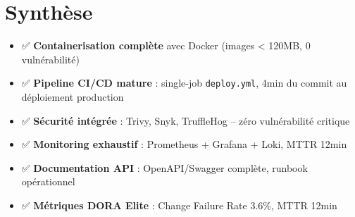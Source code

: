\section{Synthèse}

\begin{tcolorbox}[colback=blue!5!white,colframe=blue!60!black,title=\textbf{Points clés de l'infrastructure DevOps}]
\begin{itemize}
    \item ✅ \textbf{Containerisation complète} avec Docker (images < 120MB, 0 vulnérabilité)
    \item ✅ \textbf{Pipeline CI/CD mature} : single-job \texttt{deploy.yml}, 4min du commit au déploiement production
    \item ✅ \textbf{Sécurité intégrée} : Trivy, Snyk, TruffleHog -- zéro vulnérabilité critique
    \item ✅ \textbf{Monitoring exhaustif} : Prometheus + Grafana + Loki, MTTR 12min
    \item ✅ \textbf{Documentation API} : OpenAPI/Swagger complète, runbook opérationnel
    \item ✅ \textbf{Métriques DORA Elite} : Change Failure Rate 3.6\%, MTTR 12min
\end{itemize}
\end{tcolorbox}
